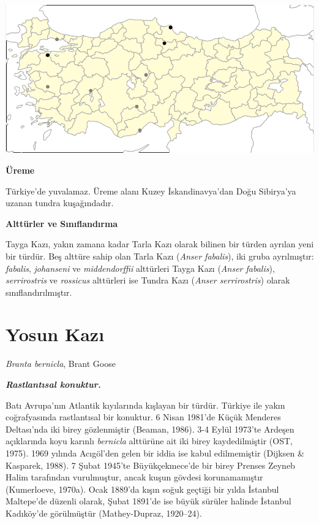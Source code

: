 \documentclass[
  a4paper,
  DIV=11,
  numbers=noendperiod]{scrreprt}
\begin{document}
\includegraphics[width=6.25in,height=\textheight]{images/harita_Anser_serrirostris.png}

\textbf{Üreme}

Türkiye'de yuvalamaz. Üreme alanı Kuzey İskandinavya'dan Doğu Sibirya'ya
uzanan tundra kuşağındadır.

\textbf{Alttürler ve Sınıflandırma}

Tayga Kazı, yakın zamana kadar Tarla Kazı olarak bilinen bir türden
ayrılan yeni bir türdür. Beş alttüre sahip olan Tarla Kazı (\emph{Anser
fabalis}), iki gruba ayrılmıştır: \emph{fabalis}, \emph{johanseni} ve
\emph{middendorffii} alttürleri Tayga Kazı (\emph{Anser fabalis}),
\emph{serrirostris} ve \emph{rossicus} alttürleri ise Tundra Kazı
(\emph{Anser serrirostris}) olarak sınıflandırılmıştır.

\section{Yosun Kazı}\label{yosun-kazux131}

\emph{Branta bernicla}, Brant Goose

\textbf{\emph{Rastlantısal konuktur.}}

Batı Avrupa'nın Atlantik kıyılarında kışlayan bir türdür. Türkiye ile
yakın coğrafyasında rastlantısal bir konuktur. 6 Nisan 1981'de Küçük
Menderes Deltası'nda iki birey gözlenmiştir (Beaman, 1986). 3-4 Eylül
1973'te Ardeşen açıklarında koyu karınlı \emph{bernicla} alttürüne ait
iki birey kaydedilmiştir (OST, 1975). 1969 yılında Acıgöl'den gelen bir
iddia ise kabul edilmemiştir (Dijksen \& Kasparek, 1988). 7 Şubat
1945'te Büyükçekmece'de bir birey Prenses Zeyneb Halim tarafından
vurulmuştur, ancak kuşun gövdesi korunamamıştır (Kumerloeve, 1970a).
Ocak 1889'da kışın soğuk geçtiği bir yılda İstanbul Maltepe'de düzenli
olarak, Şubat 1891'de ise büyük sürüler halinde İstanbul Kadıköy'de
görülmüştür (Mathey-Dupraz, 1920--24).
\end{document}
